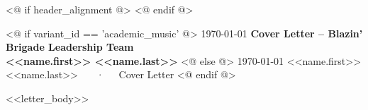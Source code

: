 \documentclass[<<font_size>>, <<paper_size>>]{../src/awesome-cv}
\begin{document}
<@ if header_alignment @>\makecvheader
<@ endif @>

\vspace{-0.3em}

<@ if variant_id == 'academic_music' @>
\makecvfooter
  {\today}
  { \textbf{Cover Letter -- Blazin' Brigade Leadership Team} \\ \textbf{<<name.first>> <<name.last>>} }
  {}
<@ else @>
\makecvfooter
  {\today}
  { <<name.first>> <<name.last>> ~~~·~~~Cover Letter }
  {}
<@ endif @>

\makelettertitle


<<letter_body>>

\makeletterclosing
\end{document}
